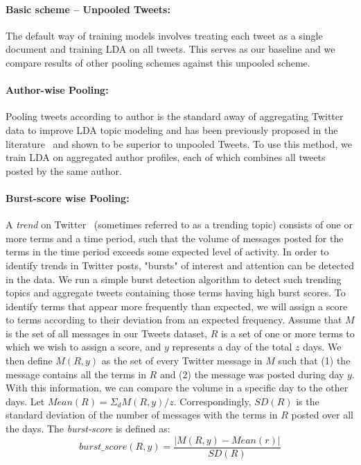 \documentclass[10pt,a5paper,twoside]{article}
\begin{document}
\paragraph{Basic scheme -- Unpooled Tweets:}

The default way of training models involves treating each tweet as a
single document and training LDA on all tweets. This serves as our
baseline and we compare results of other pooling schemes against this
unpooled scheme. 

\paragraph{Author-wise Pooling: }

Pooling tweets according to author is the standard away of aggregating
Twitter data to improve LDA topic modeling and has been previously
proposed in the literature~\cite{Weng2010wsdm,hong} and shown to be
superior to unpooled Tweets.  To use this method, we train LDA on
aggregated author profiles, each of which combines all tweets posted
by the same author.  

\paragraph{Burst-score wise Pooling:}

A \textit{trend} on Twitter~\cite{mor} (sometimes referred to as a trending
topic) consists of one or more terms and a time period, such that the
volume of messages posted for the terms in the time period exceeds
some expected level of activity.  In order to identify trends in
Twitter posts, "bursts" of interest and attention can be detected in
the data. We run a simple burst detection algorithm to detect such
trending topics and aggregate tweets containing those terms having
high burst scores.  To identify terms that appear more frequently than
expected, we will assign a score to terms according to their deviation
from an expected frequency. Assume that $M$ is the set of all messages
in our Tweets dataset, $R$ is a set of one or more terms to which we
wish to assign a score, and $y$ represents a day of the total $z$
days. We then define $M(R, y)$ as the set of every Twitter message in
$M$ such that (1) the message contains all the terms in $R$ and (2)
the message was posted during day $y$. With this information, we can
compare the volume in a specific day to the other days. Let $ Mean(R)
= \Sigma_d M(R,y) / z $.  Correspondingly, $ SD(R) $ is the standard
deviation of the number of messages with the terms in $R$ posted over
all the days. The \textit{burst-score} is defined as:
\[
burst\_score(R,y) = \frac{|M(R,y) - Mean(r)|}{SD(R)} 
\]
\end{document}
